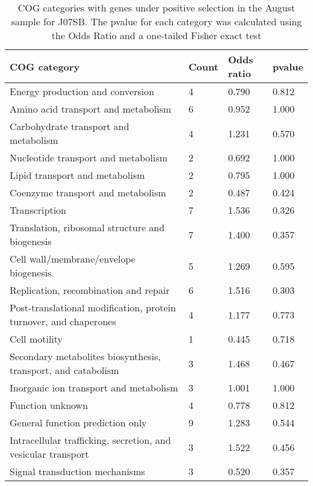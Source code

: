 \begin{table}[hb]
\footnotesize 
	\tabcolsep=0.11cm 
\caption{COG categories with genes under positive selection in the August sample for J07SB. The pvalue for each category was calculated using the Odds Ratio and a one-tailed Fisher exact test} 
\begin{tabularx}{\textwidth}{L{6cm}R{2cm}R{2cm}R{2cm}} 
\hline 
\textbf{COG category} & \textbf{Count} & \textbf{Odds ratio} & \textbf{pvalue} \\ 
\hline 
Energy production and conversion & 4 & 0.790 & 0.812 \\ 
Amino acid transport and metabolism & 6 & 0.952 & 1.000 \\ 
Carbohydrate transport and metabolism & 4 & 1.231 & 0.570 \\ 
Nucleotide transport and metabolism & 2 & 0.692 & 1.000 \\ 
Lipid transport and metabolism & 2 & 0.795 & 1.000 \\ 
Coenzyme transport and metabolism & 2 & 0.487 & 0.424 \\ 
Transcription & 7 & 1.536 & 0.326 \\ 
Translation, ribosomal structure and biogenesis & 7 & 1.400 & 0.357 \\ 
Cell wall/membrane/envelope biogenesis & 5 & 1.269 & 0.595 \\ 
Replication, recombination and repair & 6 & 1.516 & 0.303 \\ 
Post-translational modification, protein turnover, and chaperones & 4 & 1.177 & 0.773 \\ 
Cell motility & 1 & 0.445 & 0.718 \\ 
Secondary metabolites biosynthesis, transport, and catabolism & 3 & 1.468 & 0.467 \\ 
Inorganic ion transport and metabolism & 3 & 1.001 & 1.000 \\ 
Function unknown & 4 & 0.778 & 0.812 \\ 
General function prediction only & 9 & 1.283 & 0.544 \\ 
Intracellular trafficking, secretion, and vesicular transport & 3 & 1.522 & 0.456 \\ 
Signal transduction mechanisms & 3 & 0.520 & 0.357 \\ 
\end{tabularx} 
\label{August_COG_Selection_J07SB} 
 \end{table} 

